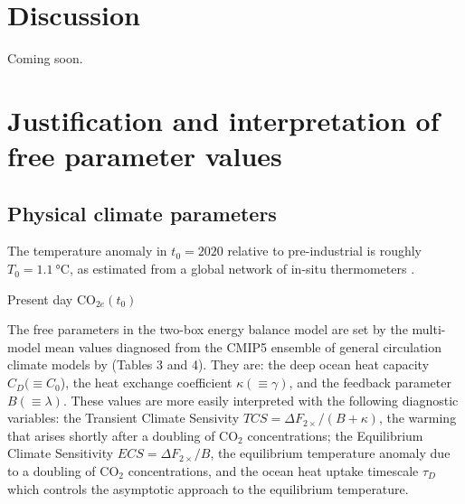 \documentclass{article}
\begin{document}



\section{Discussion}

Coming soon.

\appendix
\appendixpage
\addappheadtotoc


\section{Justification and interpretation of free parameter values}\label{app.parameters}

\subsection{Physical climate parameters}
The temperature anomaly in $t_{0}=2020$ relative to pre-industrial is roughly $T_{0} = \SI{1.1}{\celsius}$, as estimated from a global network of in-situ thermometers \citep{lenssen_improvements_2019, nasagisstemp}.

Present day CO$_{2e}(t_{0})$

The free parameters in the two-box energy balance model are set by the multi-model mean values diagnosed from the CMIP5 ensemble of general circulation climate models by \cite{geoffroy_transient_2012} (Tables 3 and 4). They are: the deep ocean heat capacity $C_{D} (\equiv C_{0}$), the heat exchange coefficient $\kappa (\equiv \gamma)$, and the feedback parameter $B (\equiv \lambda)$. These values are more easily interpreted with the following diagnostic variables: the Transient Climate Sensivity $TCS = \Delta F_{2\times}/(B + \kappa)$, the warming that arises shortly after a doubling of CO$_{2}$ concentrations; the Equilibrium Climate Sensitivity $ECS = \Delta F_{2\times}/B$, the equilibrium temperature anomaly due to a doubling of CO$_{2}$ concentrations, and the ocean heat uptake timescale $\tau_{D}$ which controls the asymptotic approach to the equilibrium temperature.
\end{document}
